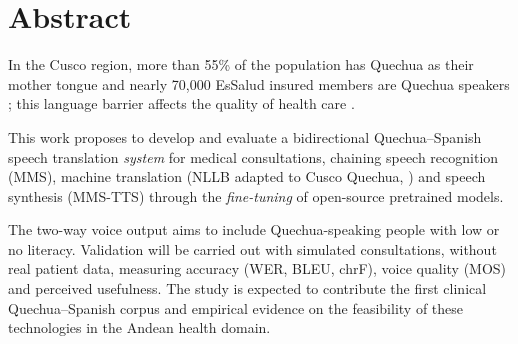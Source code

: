 \newpage
\section*{Abstract}
\singlespacing\noindent
In the Cusco region, more than 55\% of the population has Quechua as their mother tongue and
nearly 70{,}000 EsSalud insured members are Quechua speakers \parencite{essalud2023}; this language
barrier affects the quality of health care \parencite{begazo2026}.

This work proposes to develop and
evaluate a bidirectional Quechua--Spanish speech translation \emph{system} for medical consultations,
chaining speech recognition (MMS), machine translation (NLLB adapted to Cusco Quechua, ) and
speech synthesis (MMS-TTS) through the \emph{fine-tuning} of open-source pretrained models.

The
two-way voice output aims to include Quechua-speaking people with low or no literacy. Validation will
be carried out with simulated consultations, without real patient data, measuring accuracy (WER,
BLEU, chrF), voice quality (MOS) and perceived usefulness. The study is expected to contribute the
first clinical Quechua--Spanish corpus and empirical evidence on the feasibility of these
technologies in the Andean health domain.

\vspace{0.3cm}
\noindent{}
\onehalfspacing
